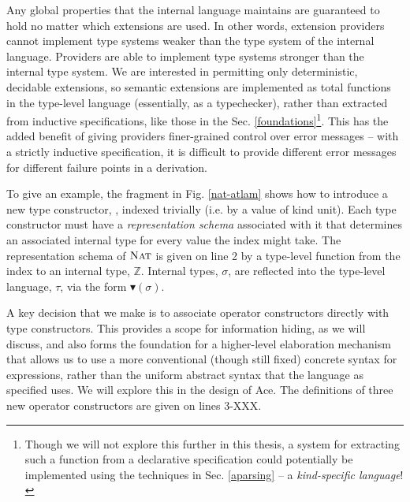 Any  global properties that the internal language maintains are guaranteed to hold no matter which extensions are used. In other words, extension providers cannot implement type systems weaker than the type system of the internal language. Providers are able to implement type systems stronger than the internal type system. We are interested in permitting only deterministic, decidable extensions, so semantic extensions are implemented as total functions in the type-level language (essentially, as a typechecker), rather than extracted from inductive specifications, like those in the Sec. \ref{foundations}\footnote{Though we will not explore this further in this thesis, a system for extracting such a function from a declarative specification could potentially be implemented using the techniques in Sec. \ref{aparsing} -- a \emph{kind-specific language}!}. This has the added benefit of giving providers finer-grained control over error messages -- with a strictly inductive specification, it is difficult to provide different error messages for different failure points in a derivation.

To give an example, the fragment in Fig. \ref{nat-atlam} shows how to introduce a new type constructor, , indexed trivially (i.e. by a value of kind unit). Each type constructor must have a \emph{representation schema} associated with it that determines an associated internal type for every value  the index might take. The {representation schema} of $\textsc{Nat}$ is given on line 2 by a type-level function from the index to an internal type, $\mathbb{Z}$. Internal types, $\sigma$, are reflected into the type-level language, $\tau$, via the form $\blacktriangledown(\sigma)$. 

A key decision that we make is to associate operator constructors directly with type constructors. This provides a scope for information hiding, as we will discuss, and also forms the foundation for a higher-level  elaboration mechanism that allows us to use a more conventional (though still fixed) concrete syntax for expressions, rather than the uniform abstract syntax that the language as specified uses. We will explore this in the design of Ace. The definitions of three new operator constructors are given on lines 3-XXX. 


